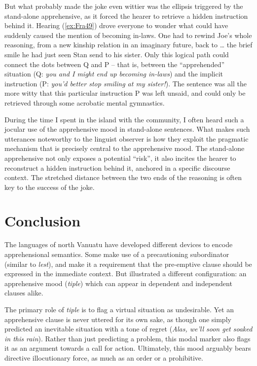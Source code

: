 \documentclass[output=paper,colorlinks,citecolor=brown]{langscibook}
\begin{document}
But what probably made the joke even wittier was the ellipsis triggered by the stand-alone apprehensive, as it forced the hearer to retrieve a hidden instruction behind it. Hearing (\ref{ex:Fra49}) drove everyone to wonder what could have suddenly caused the mention of becoming in-laws. One had to rewind Joe's whole reasoning, from a new kinship relation in an imaginary future, back to {\ldots} the brief smile he had just seen Stan send to his sister. Only this logical path could connect the dots between Q and P -- that is, between the ``apprehended'' situation (Q: \textit{you and I might end up becoming in-laws}) and the implicit instruction (P: \textit{you'd better stop smiling at my sister!}). The sentence was all the more witty that this particular instruction P was left unsaid, and could only be retrieved through some acrobatic mental gymnastics.


During the time I spent in the island with the community, I often heard such a jocular use of the apprehensive mood in stand-alone sentences. What makes such utterances noteworthy to the linguist observer is how they exploit the pragmatic mechanism that is precisely central to the apprehensive mood. The stand-alone apprehensive not only exposes a potential ``risk'', it also incites the hearer to reconstruct a hidden instruction behind it, anchored in a specific discourse context. The stretched distance between the two ends of the reasoning is often key to the success of the joke.


\section{Conclusion}
 
The languages of north Vanuatu have developed different devices to encode appre\-hen\-sional semantics. Some make use of a precautioning subordinator (simi\-lar to  \textit{lest}), and make it a requirement that the pre-emptive clause should be expressed in the immediate context. But  illustrated a different configuration: an apprehensive mood (\textit{tiple}) which can appear in dependent and independent clauses alike.


The primary role of   \textit{tiple} is to flag a virtual situation as undesirable. Yet an apprehensive clause is never uttered for its own sake, as though one simply predicted an inevitable situation with a tone of regret (\textit{Alas, we'll soon get soaked in this rain}). Rather than just predicting a problem, this modal marker also flags it as an argument towards a call for action. Ultimately, this mood arguably bears directive illocutionary force, as much as an order or a prohibitive.
\end{document}
